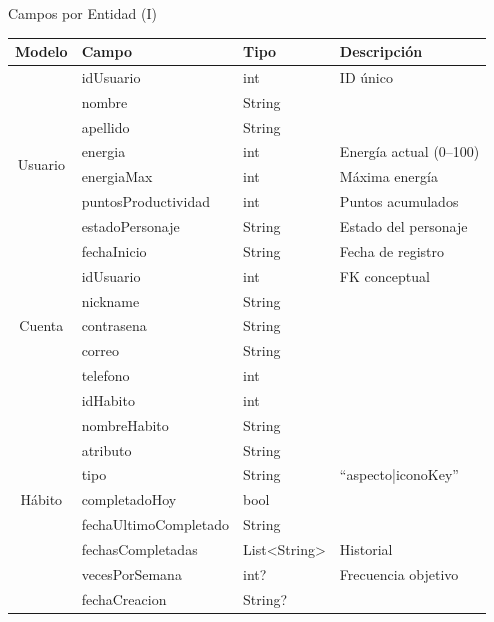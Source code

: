 \documentclass[11pt,landscape]{beamer}
\begin{document}
\begin{frame}{Campos por Entidad (I)}
  \centering
  \begin{tabular}{clll}
    \toprule
    \rowcolor{black!45}
    \textbf{Modelo} & \textbf{Campo} & \textbf{Tipo} & \textbf{Descripción} \\
    \midrule
    \multirow{8}{*}{Usuario} & idUsuario & int & ID único \\
     & nombre & String & \\
     & apellido & String & \\
     & energia & int & Energía actual (0--100) \\
     & energiaMax & int & Máxima energía \\
     & puntosProductividad & int & Puntos acumulados \\
     & estadoPersonaje & String & Estado del personaje \\
     & fechaInicio & String & Fecha de registro \\
    \midrule
    \multirow{5}{*}{Cuenta} & idUsuario & int & FK conceptual \\
     & nickname & String & \\
     & contrasena & String & \\
     & correo & String & \\
     & telefono & int & \\
    \midrule
    \multirow{9}{*}{Hábito} & idHabito & int & \\
     & nombreHabito & String & \\
     & atributo & String & \\
     & tipo & String & ``aspecto|iconoKey'' \\
     & completadoHoy & bool & \\
     & fechaUltimoCompletado & String & \\
     & fechasCompletadas & List<String> & Historial \\
     & vecesPorSemana & int? & Frecuencia objetivo \\
     & fechaCreacion & String? & \\
    \bottomrule
  \end{tabular}
\end{frame}
\end{document}
